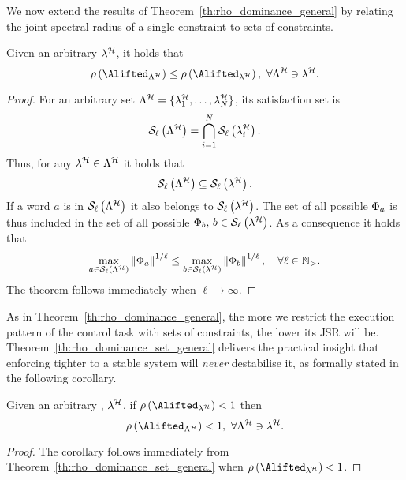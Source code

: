 We now extend the results of Theorem~\ref{th:rho_dominance_general} by relating the joint spectral radius of a single constraint to sets of constraints.
\begin{theorem}%
    \label{th:rho_dominance_set_general}%
    Given an arbitrary \ewhc{} $\lambda^{\mathcal{H}}$, it holds that
    \begin{equation*}
        \rho\left(\Alifted_{\Lambda^\strat}\right) \leq \rho \left( \Alifted_{\lambda^\strat} \right) ,\,\, \forall \Lambda^\strat \ni \lambda^\strat.
    \end{equation*}
    \begin{proof}
        For an arbitrary \ewhc{} set $\Lambda^{\mathcal{H}} = \{\lambda^{\mathcal{H}}_1, \dots, \lambda^{\mathcal{H}}_N\}$, its satisfaction set is 
        \begin{equation*}%
            \sset{\ell}{\Lambda^\strat} = \bigcap_{i = 1}^N \sset{\ell}{\lambda^\strat_i}.
        \end{equation*}
        Thus, for any $\lambda^{\mathcal{H}} \in \Lambda^{\mathcal{H}}$ it holds that 
        \begin{equation*}
            \mathcal{S}_{\ell}\left( \Lambda^{\mathcal{H}} \right) \subseteq \mathcal{S}_{\ell}\left( \lambda^{\mathcal{H}} \right).
        \end{equation*}
        If a word $a$ is in $\mathcal{S}_{\ell}\left( \Lambda^{\mathcal{H}} \right)$ it also belongs to $\mathcal{S}_{\ell}\left( \lambda^{\mathcal{H}} \right)$. 
        The set of all possible $\Phi{}_{a}$ is thus included in the set of all possible $\Phi{}_{b},\, b \in \mathcal{S}_{\ell}\left( \lambda^{\mathcal{H}} \right)$.
        As a consequence it holds that
        \begin{equation*}
            \max_{a \in \mathcal{S}_{\ell}\left( \Lambda^{\mathcal{H}}  \right)} \left\lVert\Phi{}_{a}\right\rVert^{1/\ell} \leq
            \max_{b \in \mathcal{S}_{\ell}\left( \lambda^{\mathcal{H}}  \right)} \left\lVert\Phi{}_{b}\right\rVert^{1/\ell}, \quad
            \forall \ell\in\mathbb{N}_{>}.
        \end{equation*}
        The theorem follows immediately when $\ell\rightarrow \infty$.
    \end{proof}
\end{theorem}

As in Theorem~\ref{th:rho_dominance_general}, the more we restrict the execution pattern of the control task with sets of constraints, the lower its JSR will be.
Theorem~\ref{th:rho_dominance_set_general} delivers the practical insight that enforcing tighter \ewhc{} to a stable system will \emph{never} destabilise it, as formally stated in the following corollary.
\begin{corollary}%
    \label{cor:rho_dominance_set}%
    Given an arbitrary \ewhc{}, $\lambda^{\mathcal{H}}$, if $\rho \left( \Alifted_{\lambda^\strat} \right) < 1$ then
    \begin{equation*}
        \rho\left(\Alifted_{\Lambda^\strat}\right) < 1 ,\,\, \forall \Lambda^\strat \ni \lambda^\strat.
    \end{equation*}

    \begin{proof}
        The corollary follows immediately from Theorem~\ref{th:rho_dominance_set_general} when $\rho \left( \Alifted_{\lambda^\strat} \right) < 1$.
    \end{proof}
\end{corollary}
